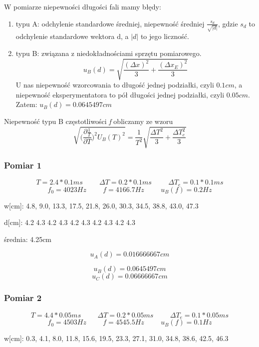 \documentclass[12pt,a4paper]{article}
\begin{document}
W pomiarze niepewności długości fali mamy błędy:
\begin{enumerate}
\item  typu A: odchylenie standardowe średniej, niepewność średniej $\frac{s_d}{\sqrt{|d|}}$, gdzie $s_d$ to odchylenie standardowe wektora d, a $|d|$ to jego liczność. 
\item typu B: związana z niedokładnościami sprzętu pomiarowego. $$u_B(d) = \sqrt{\frac{(\Delta x)^2}{3} + \frac{(\Delta x_E)^2}{3}}$$
U nas niepewność wzorcowania to długość jednej podziałki, czyli $0.1 cm$, a niepewność eksperymentatora to pół długości jednej podziałki, czyli $0.05 cm$.
Zatem: $u_B(d) = 0.0645497cm $
\end{enumerate} 

Niepewność typu B częstotliwości \textit{f} obliczamy ze wzoru $$\sqrt{\bigg(\frac{\partial \frac{1}{T}}{\partial T}\bigg)^2 U_B(T)^2} = \frac{1}{T^2} \sqrt{\frac{\Delta T^2}{3}+\frac{\Delta T_e^2}{3}}$$

\subsubsection{Pomiar 1}
$$
T = 2.4*0.1ms \hspace{1cm} \Delta T = 0.2*0.1ms \hspace{1cm} \Delta T_e = 0.1*0.1ms 
$$
$$
f_0 = 4023Hz \hspace{1cm} f=4166.7Hz \hspace{1cm} u_B(f)=0.2Hz
$$

w[cm]: 4.8, 9.0, 13.3, 17.5, 21.8, 26.0, 30.3, 34.5, 38.8, 43.0, 47.3

d[cm]: 4.2 4.3 4.2 4.3 4.2 4.3 4.2 4.3 4.2 4.3

\begin{center}
średnia: 4.25cm
\end{center}
$$
u_A(d) = 0.016666667cm
$$

$$u_B(d) = 0.0645497cm $$
$$u_C(d) = 0.06666667cm $$
\subsubsection{Pomiar 2}
$$
T = 4.4*0.05ms \hspace{1cm} \Delta T = 0.2*0.05ms \hspace{1cm} \Delta T_e = 0.1*0.05ms 
$$
$$
f_0 = 4503 Hz \hspace{1cm} f=4545.5Hz \hspace{1cm} u_B(f)=0.1Hz
$$

w[cm]: 0.3, 4.1, 8.0, 11.8, 15.6, 19.5, 23.3, 27.1, 31.0, 34.8, 38.6, 42.5, 46.3
\end{document}
